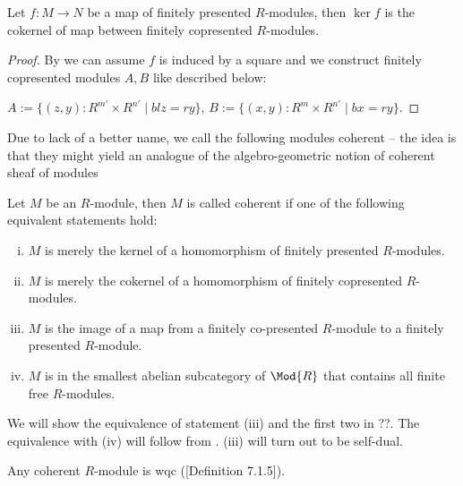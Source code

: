 \begin{lemma}
  \label{kernel-fp-is-cok-fcp}       
  Let $f:M\to N$ be a map of finitely presented $R$-modules, then $\ker f$ is the cokernel of map between finitely copresented $R$-modules.
\end{lemma}

\begin{proof}
  By  we can assume $f$ is induced by a square and we construct finitely copresented modules $A,B$ like described below:
  \begin{center}
   \end{center}
   $A:=\{(z,y):R^{m'}\times R^{n'}\mid blz=ry\}$, $B:=\{(x,y):R^{m}\times R^{n'}\mid bx=ry\}$.
\end{proof}

Due to lack of a better name, we call the following modules coherent --
the idea is that they might yield an analogue of the algebro-geometric notion of coherent sheaf of modules

\begin{definition}
  Let $M$ be an $R$-module, then $M$ is called coherent if one of the following equivalent statements hold:
  \begin{enumerate}[(i)]
  \item $M$ is merely the kernel of a homomorphism of finitely presented $R$-modules.
  \item $M$ is merely the cokernel of a homomorphism of finitely copresented $R$-modules.
  \item $M$ is the image of a map from a finitely co-presented $R$-module to a finitely presented $R$-module.
  \item $M$ is in the smallest abelian subcategory of $\Mod{R}$ that contains all finite free $R$-modules.
  \end{enumerate}
\end{definition}
We will show the equivalence of statement (iii) and the first two in ??.
The equivalence with (iv) will follow from .
(iii) will turn out to be self-dual.

\begin{remark}
  Any coherent $R$-module is wqc (\cite{draft}[Definition 7.1.5]).
\end{remark}


